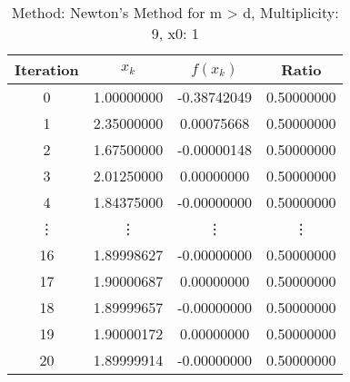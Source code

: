 \begin{table}
\centering
\caption{Method: Newton's Method for m > d, Multiplicity: 9, x0: 1}
\label{tab:table_Newton's_Method_for_m_>_d_9_1}
\begin{tabular}{c c c c}
\toprule
Iteration &      $x_k$ &    $f(x_k)$ &      Ratio \\
\midrule
        0 & 1.00000000 & -0.38742049 & 0.50000000 \\
        1 & 2.35000000 &  0.00075668 & 0.50000000 \\
        2 & 1.67500000 & -0.00000148 & 0.50000000 \\
        3 & 2.01250000 &  0.00000000 & 0.50000000 \\
        4 & 1.84375000 & -0.00000000 & 0.50000000 \\
   \vdots &     \vdots &      \vdots &     \vdots \\
       16 & 1.89998627 & -0.00000000 & 0.50000000 \\
       17 & 1.90000687 &  0.00000000 & 0.50000000 \\
       18 & 1.89999657 & -0.00000000 & 0.50000000 \\
       19 & 1.90000172 &  0.00000000 & 0.50000000 \\
       20 & 1.89999914 & -0.00000000 & 0.50000000 \\
\bottomrule
\end{tabular}
\end{table}
